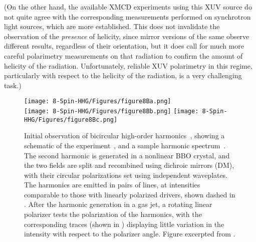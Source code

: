(On the other hand, the available XMCD experiments using this XUV source do not quite agree with the corresponding measurements performed on synchrotron light sources, which are more established. This does not invalidate the observation of the \textit{presence} of helicity, since mirror versions of the same observe different results, regardless of their orientation, but it does call for much more careful polarimetry measurements on that radiation to confirm the amount of helicity of the radiation. Unfortunately, reliable XUV polarimetry in this regime, particularly with respect to the helicity of the radiation, is a very challenging task.)




\begin{figure}[b!]
  \centering
  \subfigure{\label{f8-fleischer-bicircular-spectrum-a}}
  \texttt{[image: 8-Spin-HHG/Figures/figure8Ba.png]}
  \\[4mm]
  \subfigure{\label{f8-fleischer-bicircular-spectrum-b}}
  \texttt{[image: 8-Spin-HHG/Figures/figure8Bb.png]}
  \hspace{5mm}
  \subfigure{\label{f8-fleischer-bicircular-spectrum-c}}
  \texttt{[image: 8-Spin-HHG/Figures/figure8Bc.png]}
  \caption[
  Initial observation of bicircular high-order harmonics by A. Fleischer~et~al.
  ]{
  Initial observation of bicircular high-order harmonics~\cite{fleischer_spin_2014}, showing a schematic of the experiment~\protect{}, and a sample harmonic spectrum~\protect{}. The second harmonic is generated in a nonlinear BBO crystal, and the two fields are split and recombined using dichroic mirrors (DM), with their circular polarizations set using independent waveplates. 
  The harmonics are emitted in pairs of lines, at intensities comparable to those with linearly polarized drivers, shown dashed in \protect{}.
  After the harmonic generation in a gas jet, a rotating linear polarizer tests the polarization of the harmonics, with the corresponding traces (shown in \protect{}) displaying little variation in the intensity with respect to the polarizer angle.
  Figure excerpted from .
  }
  \label{f8-fleischer-bicircular-spectrum}
\end{figure}

